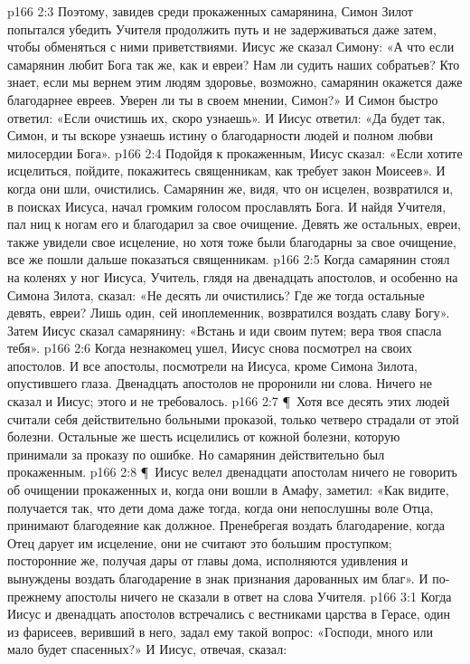 \vs p166 2:3 Поэтому, завидев среди прокаженных самарянина, Симон Зилот попытался убедить Учителя продолжить путь и не задерживаться даже затем, чтобы обменяться с ними приветствиями. Иисус же сказал Симону: «А что если самарянин любит Бога так же, как и евреи? Нам ли судить наших собратьев? Кто знает, если мы вернем этим людям здоровье, возможно, самарянин окажется даже благодарнее евреев. Уверен ли ты в своем мнении, Симон?» И Симон быстро ответил: «Если очистишь их, скоро узнаешь». И Иисус ответил: «Да будет так, Симон, и ты вскоре узнаешь истину о благодарности людей и полном любви милосердии Бога».
\vs p166 2:4 Подойдя к прокаженным, Иисус сказал: «Если хотите исцелиться, пойдите, покажитесь священникам, как требует закон Моисеев». И когда они шли, очистились. Самарянин же, видя, что он исцелен, возвратился и, в поисках Иисуса, начал громким голосом прославлять Бога. И найдя Учителя, пал ниц к ногам его и благодарил за свое очищение. Девять же остальных, евреи, также увидели свое исцеление, но хотя тоже были благодарны за свое очищение, все же пошли дальше показаться священникам.
\vs p166 2:5 Когда самарянин стоял на коленях у ног Иисуса, Учитель, глядя на двенадцать апостолов, и особенно на Симона Зилота, сказал: «Не десять ли очистились? Где же тогда остальные девять, евреи? Лишь один, сей иноплеменник, возвратился воздать славу Богу». Затем Иисус сказал самарянину: «Встань и иди своим путем; вера твоя спасла тебя».
\vs p166 2:6 Когда незнакомец ушел, Иисус снова посмотрел на своих апостолов. И все апостолы, посмотрели на Иисуса, кроме Симона Зилота, опустившего глаза. Двенадцать апостолов не проронили ни слова. Ничего не сказал и Иисус; этого и не требовалось.
\vs p166 2:7 \P\ Хотя все десять этих людей считали себя действительно больными проказой, только четверо страдали от этой болезни. Остальные же шесть исцелились от кожной болезни, которую принимали за проказу по ошибке. Но самарянин действительно был прокаженным.
\vs p166 2:8 \P\ Иисус велел двенадцати апостолам ничего не говорить об очищении прокаженных и, когда они вошли в Амафу, заметил: «Как видите, получается так, что дети дома даже тогда, когда они непослушны воле Отца, принимают благодеяние как должное. Пренебрегая воздать благодарение, когда Отец дарует им исцеление, они не считают это большим проступком; посторонние же, получая дары от главы дома, исполняются удивления и вынуждены воздать благодарение в знак признания дарованных им благ». И по\hyp{}прежнему апостолы ничего не сказали в ответ на слова Учителя.
\vs p166 3:1 Когда Иисус и двенадцать апостолов встречались с вестниками царства в Герасе, один из фарисеев, веривший в него, задал ему такой вопрос: «Господи, много или мало будет спасенных?» И Иисус, отвечая, сказал:
